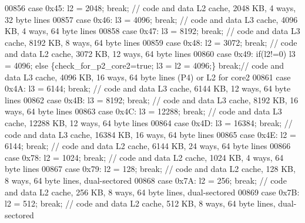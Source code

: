 \begin{DoxyCode}
{00856       \textcolor{keywordflow}{case} 0x45: l2 = 2048; \textcolor{keywordflow}{break};   \textcolor{comment}{// code and data L2 cache, 2048 KB, 4 ways, 32 byte lines}
00857       \textcolor{keywordflow}{case} 0x46: l3 = 4096; \textcolor{keywordflow}{break};   \textcolor{comment}{// code and data L3 cache, 4096 KB, 4 ways, 64 byte lines}
00858       \textcolor{keywordflow}{case} 0x47: l3 = 8192; \textcolor{keywordflow}{break};   \textcolor{comment}{// code and data L3 cache, 8192 KB, 8 ways, 64 byte lines}
00859       \textcolor{keywordflow}{case} 0x48: l2 = 3072; \textcolor{keywordflow}{break};   \textcolor{comment}{// code and data L2 cache, 3072 KB, 12 ways, 64 byte lines}
00860       \textcolor{keywordflow}{case} 0x49: \textcolor{keywordflow}{if}(l2!=0) l3 = 4096; \textcolor{keywordflow}{else} \{check\_for\_p2\_core2=\textcolor{keyword}{true}; l3 = l2 = 4096;\} \textcolor{keywordflow}{break};\textcolor{comment}{// code and
       data L3 cache, 4096 KB, 16 ways, 64 byte lines (P4) or L2 for core2}
00861       \textcolor{keywordflow}{case} 0x4A: l3 = 6144; \textcolor{keywordflow}{break};   \textcolor{comment}{// code and data L3 cache, 6144 KB, 12 ways, 64 byte lines}
00862       \textcolor{keywordflow}{case} 0x4B: l3 = 8192; \textcolor{keywordflow}{break};   \textcolor{comment}{// code and data L3 cache, 8192 KB, 16 ways, 64 byte lines}
00863       \textcolor{keywordflow}{case} 0x4C: l3 = 12288; \textcolor{keywordflow}{break};   \textcolor{comment}{// code and data L3 cache, 12288 KB, 12 ways, 64 byte lines}
00864       \textcolor{keywordflow}{case} 0x4D: l3 = 16384; \textcolor{keywordflow}{break};   \textcolor{comment}{// code and data L3 cache, 16384 KB, 16 ways, 64 byte lines}
00865       \textcolor{keywordflow}{case} 0x4E: l2 = 6144; \textcolor{keywordflow}{break};   \textcolor{comment}{// code and data L2 cache, 6144 KB, 24 ways, 64 byte lines}
00866       \textcolor{keywordflow}{case} 0x78: l2 = 1024; \textcolor{keywordflow}{break};   \textcolor{comment}{// code and data L2 cache, 1024 KB, 4 ways, 64 byte lines}
00867       \textcolor{keywordflow}{case} 0x79: l2 = 128; \textcolor{keywordflow}{break};   \textcolor{comment}{// code and data L2 cache, 128 KB, 8 ways, 64 byte lines, dual-sectored}
00868       \textcolor{keywordflow}{case} 0x7A: l2 = 256; \textcolor{keywordflow}{break};   \textcolor{comment}{// code and data L2 cache, 256 KB, 8 ways, 64 byte lines, dual-sectored}
00869       \textcolor{keywordflow}{case} 0x7B: l2 = 512; \textcolor{keywordflow}{break};   \textcolor{comment}{// code and data L2 cache, 512 KB, 8 ways, 64 byte lines, dual-sectored}
}
\end{DoxyCode}
